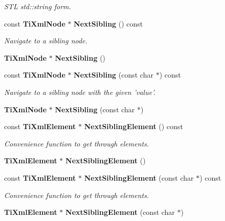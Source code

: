 \begin{CompactItemize}
\begin{CompactList}\small\item\em STL std::string form. \item\end{CompactList}\item 
const {\bf Ti\-Xml\-Node} $\ast$ {\bf Next\-Sibling} () const\label{classTiXmlNode_TiXmlUnknowna46}

\begin{CompactList}\small\item\em Navigate to a sibling node. \item\end{CompactList}\item 
{\bf Ti\-Xml\-Node} $\ast$ {\bf Next\-Sibling} ()\label{classTiXmlNode_TiXmlUnknowna47}

\item 
const {\bf Ti\-Xml\-Node} $\ast$ {\bf Next\-Sibling} (const char $\ast$) const\label{classTiXmlNode_TiXmlUnknowna48}

\begin{CompactList}\small\item\em Navigate to a sibling node with the given 'value'. \item\end{CompactList}\item 
{\bf Ti\-Xml\-Node} $\ast$ {\bf Next\-Sibling} (const char $\ast$)\label{classTiXmlNode_TiXmlUnknowna49}

\item 
const {\bf Ti\-Xml\-Element} $\ast$ {\bf Next\-Sibling\-Element} () const
\begin{CompactList}\small\item\em Convenience function to get through elements. \item\end{CompactList}\item 
{\bf Ti\-Xml\-Element} $\ast$ {\bf Next\-Sibling\-Element} ()\label{classTiXmlNode_TiXmlUnknowna51}

\item 
const {\bf Ti\-Xml\-Element} $\ast$ {\bf Next\-Sibling\-Element} (const char $\ast$) const
\begin{CompactList}\small\item\em Convenience function to get through elements. \item\end{CompactList}\item 
{\bf Ti\-Xml\-Element} $\ast$ {\bf Next\-Sibling\-Element} (const char $\ast$)\label{classTiXmlNode_TiXmlUnknowna53}


\end{CompactItemize}
